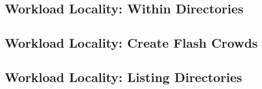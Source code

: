 \subsection{Workload Locality: Within Directories}
\subsection{Workload Locality: Create Flash Crowds}

\subsection{Workload Locality: Listing Directories}
